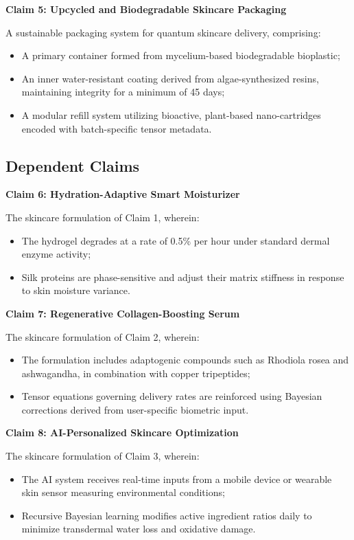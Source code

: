 \documentclass{article}
\theoremstyle{plain}
\theoremstyle{claimstyle}
\begin{document}
\textbf{Claim 5: Upcycled and Biodegradable Skincare Packaging}  

A sustainable packaging system for quantum skincare delivery, comprising:  
\begin{itemize}
    \item A primary container formed from mycelium-based biodegradable bioplastic;
    \item An inner water-resistant coating derived from algae-synthesized resins, maintaining integrity for a minimum of 45 days;
    \item A modular refill system utilizing bioactive, plant-based nano-cartridges encoded with batch-specific tensor metadata.
\end{itemize}

\subsection*{Dependent Claims}

\textbf{Claim 6: Hydration-Adaptive Smart Moisturizer}  

The skincare formulation of Claim 1, wherein:  
\begin{itemize}
    \item The hydrogel degrades at a rate of 0.5\% per hour under standard dermal enzyme activity;
    \item Silk proteins are phase-sensitive and adjust their matrix stiffness in response to skin moisture variance.
\end{itemize}

\textbf{Claim 7: Regenerative Collagen-Boosting Serum}  

The skincare formulation of Claim 2, wherein:  
\begin{itemize}
    \item The formulation includes adaptogenic compounds such as Rhodiola rosea and ashwagandha, in combination with copper tripeptides;
    \item Tensor equations governing delivery rates are reinforced using Bayesian corrections derived from user-specific biometric input.
\end{itemize}

\textbf{Claim 8: AI-Personalized Skincare Optimization}  

The skincare formulation of Claim 3, wherein:  
\begin{itemize}
    \item The AI system receives real-time inputs from a mobile device or wearable skin sensor measuring environmental conditions;
    \item Recursive Bayesian learning modifies active ingredient ratios daily to minimize transdermal water loss and oxidative damage.
\end{itemize}
\end{document}
